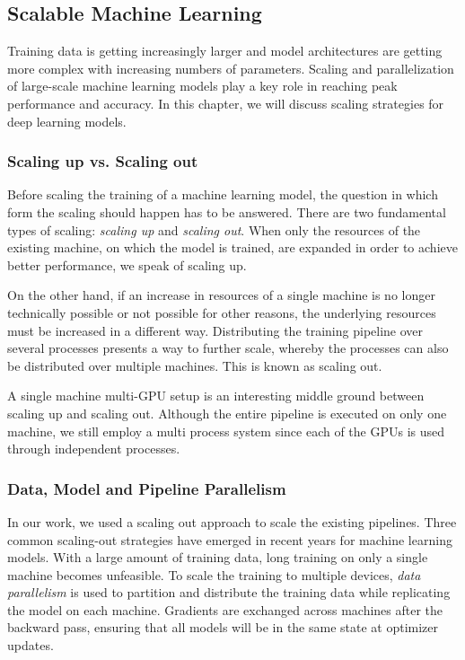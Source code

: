 \subsection{Scalable Machine Learning}

Training data is getting increasingly larger and model architectures are getting more complex with increasing numbers 
of parameters. Scaling and parallelization of large-scale machine learning models play a key role in reaching peak 
performance and accuracy. In this chapter, we will discuss scaling strategies for deep learning models. 

\subsubsection{Scaling up vs. Scaling out}

Before scaling the training of a machine learning model, the question in which form the scaling should happen has to 
be answered. There are two fundamental types of scaling: \textit{scaling up} and \textit{scaling out}. When only the resources of the 
existing machine, on which the model is trained, are expanded in order to achieve better performance, we speak of 
scaling up.

On the other hand, if an increase in resources of a single machine is no longer technically possible or not possible for 
other reasons, the underlying resources must be increased in a different way. Distributing the training pipeline over 
several processes presents a way to further scale, whereby the processes can also be distributed over multiple machines. 
This is known as scaling out. 

A single machine multi-GPU setup is an interesting middle ground between scaling up and scaling out. Although the entire 
pipeline is executed on only one machine, we still employ a multi process system since each of the GPUs is used through 
independent processes.

\subsubsection{Data, Model and Pipeline Parallelism}
\label{subsubsec:data-model-pipeline}

In our work, we used a scaling out approach to scale the existing pipelines. Three common scaling-out strategies have emerged 
in recent years for machine learning models. With a large amount of training data, long training on only a single 
machine becomes unfeasible. To scale the training to multiple devices, \textit{data parallelism} is used to partition and distribute 
the training data while replicating the model on each machine. Gradients are exchanged across machines after the backward 
pass, ensuring that all models will be in the same state at optimizer updates. 

